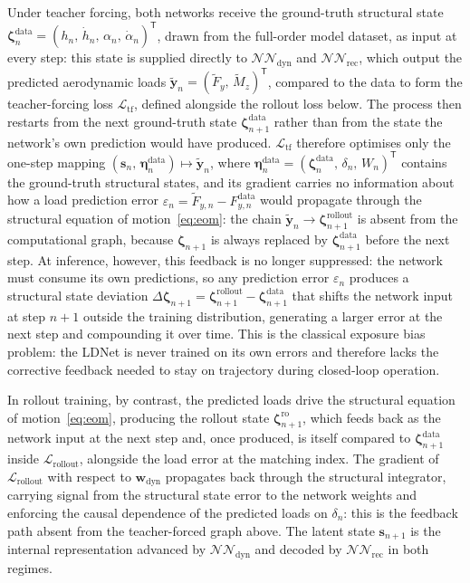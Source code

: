 Under teacher forcing, both networks receive the ground-truth structural
state $\boldsymbol{\zeta}_n^\mathrm{data} = (h_n,\allowbreak\,\dot{h}_n,\allowbreak\,\alpha_n,\allowbreak\,\dot{\alpha}_n)^\mathsf{T}$,
drawn from the full-order model dataset, as input at every step: this state
is supplied directly to $\mathcal{NN}_\mathrm{dyn}$ and $\mathcal{NN}_\mathrm{rec}$,
which output the predicted aerodynamic loads $\tilde{\mathbf{y}}_n = (\tilde{F}_y,\,\tilde{M}_z)^\mathsf{T}$,
compared to the data to form the teacher-forcing loss $\mathcal{L}_\mathrm{tf}$, defined
alongside the rollout loss below. The process then restarts from the next
ground-truth state $\boldsymbol{\zeta}_{n+1}^\mathrm{data}$
rather than from the state the network's own prediction would have produced.
$\mathcal{L}_\mathrm{tf}$ therefore optimises only the one-step mapping
$(\mathbf{s}_n,\, \boldsymbol{\eta}_n^\mathrm{data}) \mapsto \tilde{\mathbf{y}}_n$,
where $\boldsymbol{\eta}_n^\mathrm{data} = (\boldsymbol{\zeta}_n^\mathrm{data},\,\delta_n,\,W_n)^\mathsf{T}$
contains the ground-truth structural states, and its gradient carries no
information about how a load prediction error
$\varepsilon_n = \tilde{F}_{y,n} - F_{y,n}^\mathrm{data}$ would propagate
through the structural equation of motion~\eqref{eq:eom}: the chain
$\tilde{\mathbf{y}}_n \to \boldsymbol{\zeta}_{n+1}^\mathrm{rollout}$ is absent
from the computational graph, because $\boldsymbol{\zeta}_{n+1}$ is always
replaced by $\boldsymbol{\zeta}_{n+1}^\mathrm{data}$ before the next step. At
inference, however, this feedback is no longer suppressed: the network must
consume its own predictions, so any prediction error $\varepsilon_n$
produces a structural state deviation
$\Delta\boldsymbol{\zeta}_{n+1} = \boldsymbol{\zeta}_{n+1}^\mathrm{rollout} - \boldsymbol{\zeta}_{n+1}^\mathrm{data}$
that shifts the network input at step $n+1$ outside the training
distribution, generating a larger error at the next step and compounding it
over time. This is the classical exposure bias problem: the LDNet is never
trained on its own errors and therefore lacks the corrective feedback needed
to stay on trajectory during closed-loop operation.

In rollout training, by contrast, the predicted loads drive the structural equation of
motion~\eqref{eq:eom}, producing the rollout state $\boldsymbol{\zeta}_{n+1}^\mathrm{ro}$, which
feeds back as the network input at the next step and, once produced, is itself compared to
$\boldsymbol{\zeta}_{n+1}^\mathrm{data}$ inside $\mathcal{L}_\mathrm{rollout}$, alongside the load error at the matching index. The gradient
of $\mathcal{L}_\mathrm{rollout}$ with respect to $\mathbf{w}_\mathrm{dyn}$ propagates back through
the structural integrator, carrying signal from the structural state error to the network weights
and enforcing the causal dependence of the predicted loads on $\delta_n$: this is the feedback path
absent from the teacher-forced graph above. The latent state $\mathbf{s}_{n+1}$ is the internal
representation advanced by $\mathcal{NN}_\mathrm{dyn}$ and decoded by $\mathcal{NN}_\mathrm{rec}$
in both regimes.

